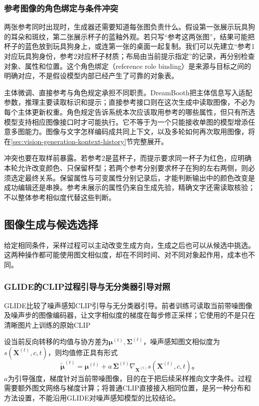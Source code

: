\subsubsection{参考图像的角色绑定与条件冲突}
\label{sec:vision-generation-reference-roles}

两张参考同时出现时，生成器还需要知道每张图负责什么。假设第一张展示玩具狗的耳朵和斑纹，第二张展示杯子的蓝釉外观。若只写“参考这两张图”，结果可能把杯子的蓝色放到玩具狗身上，或连第一张的桌面一起复制。我们可以先建立“参考1对应玩具狗身份，参考2对应杯子材质；布局由当前提示指定”的记录，再分别检查对象、属性和位置。这个角色绑定（reference role binding）是来源与目标之间的明确对应，不是假设模型内部已经产生了可靠的对象表。

主体微调、直接参考与角色规定承担不同职责。DreamBooth把主体信息写入适配参数，推理主要读取标识和提示；直接参考接口则在这次生成中读取图像，不必为每个主体更新权重。角色规定告诉系统本次应该取用参考的哪些属性，但只有所选模型支持相应图像接口时才可能执行。它不等于为一个只能接收单图的模型增添任意多图能力。图像与文字怎样编码成共同上下文，以及多轮如何再次取用图像，将在\ref{sec:vision-generation-kontext-history}节完整展开。

冲突也要在取样前暴露。若参考2是蓝杯子，而提示要求同一杯子为红色，应明确本轮允许改变颜色、只保留杯型；若两个参考分别要求杯子在狗的左右两侧，则必须选定最终关系。保留属性与可变属性分别记录后，才能判断输出中的颜色改变是成功编辑还是串换。参考未展示的属性仍来自生成先验，精确文字还需读取核验；不以整体参考相似度代替这些判断。

\subsection{图像生成与候选选择}
\label{sec:vision-generation-selection}

给定相同条件，采样过程可以主动改变生成方向，生成之后也可以从候选中挑选。这两种操作都可能使用图文相似度，却在不同时间、对不同对象起作用，成本也不同。

\Needspace{60mm}
\subsubsection{GLIDE的CLIP过程引导与无分类器引导对照}
\label{sec:vision-generation-glide-guidance}

GLIDE比较了噪声感知CLIP引导与无分类器引导。前者训练可读取当前带噪图像及噪声步的图像编码器，让文字相似度的梯度在每步修正采样；它使用的不是只在清晰图片上训练的原始CLIP

设当前反向转移的均值与协方差为$\bm{\mu}^{(t)},\bm{\Sigma}^{(t)}$，噪声感知图文相似度为$s(\bm{X}^{(t)},c,t)$，则均值修正具有形式
\begin{equation}
 \tilde{\bm{\mu}}^{(t)}
 =\bm{\mu}^{(t)}
  +a\,\bm{\Sigma}^{(t)}
   \nabla_{\bm{X}^{(t)}}s(\bm{X}^{(t)},c,t)\text{。}
 \label{eq:vision-clip-process-guidance}
\end{equation}
$a$为引导强度，梯度针对当前带噪图像，目的在于把后续采样推向文字条件。过程需要额外图文网络与梯度计算；将普通CLIP直接接入相同位置，是另一种分布和方法设置，不能沿用GLIDE对噪声感知模型的比较结论。

